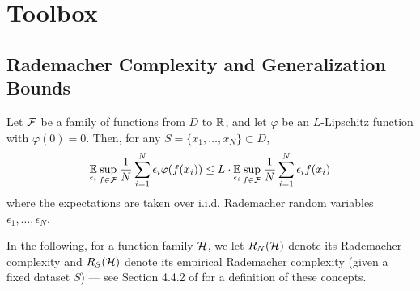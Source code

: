 \section{Toolbox}


\subsection{Rademacher Complexity and Generalization Bounds}

\begin{lemma} \label{lemma:basic_contraction_principle}
Let $\mathcal{F}$ be a family of functions from $D$ to $\mathbb{R}$, and let $\varphi$ be an $L$-Lipschitz function with $\varphi(0) = 0$. Then, for any $S = \{x_1, \ldots, x_N\} \subset D$,
\begin{align}
\operatorname*{\mathbb{E}}_{\epsilon_i} \sup_{f \in \mathcal{F}} \frac{1}{N} \sum_{i = 1}^N \epsilon_i \varphi(f(x_i)) \leq L \cdot \operatorname*{\mathbb{E}}_{\epsilon_i} \sup_{f \in \mathcal{F}} \frac{1}{N} \sum_{i = 1}^N \epsilon_i f(x_i)
\end{align}
where the expectations are taken over i.i.d. Rademacher random variables $\epsilon_1, \ldots, \epsilon_N$.
\end{lemma}

In the following, for a function family $\mathcal{H}$, we let ${R_N}(\mathcal{H})$ denote its Rademacher complexity and ${R_S}(\mathcal{H})$ denote its empirical Rademacher complexity (given a fixed dataset $S$) --- see Section 4.4.2 of \citet{cs229m_notes} for a definition of these concepts.

